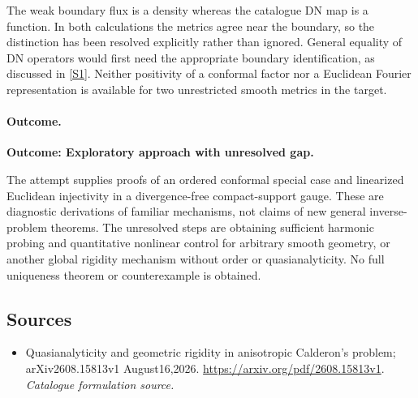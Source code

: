 \documentclass[11pt,a4paper]{article}
\newcommand{\sref}[2]{\hyperlink{source:#1:#2}{[S#2]}}
\numberwithin{equation}{section}
\begin{document}
The weak boundary flux is a density whereas the catalogue DN map is a
function. In both calculations the metrics agree near the boundary, so
the distinction has been resolved explicitly rather than ignored. General
equality of DN operators would first need the appropriate boundary
identification, as discussed in \sref{30006770}{1}. Neither positivity of a
conformal factor nor a Euclidean Fourier representation is available for
two unrestricted smooth metrics in the target.

\paragraph{Outcome.}
\textbf{Outcome: Exploratory approach with unresolved gap.}

The attempt supplies proofs of an ordered conformal special case and
linearized Euclidean injectivity in a divergence-free compact-support
gauge. These are diagnostic derivations of familiar mechanisms, not claims
of new general inverse-problem theorems. The unresolved steps are obtaining
sufficient harmonic probing and quantitative nonlinear control for arbitrary
smooth geometry, or another global rigidity mechanism without order or
quasianalyticity. No full uniqueness theorem or counterexample is obtained.
\subsection{Sources}
\begin{itemize}\raggedright
\item[\textnormal{[S1]}]\hypertarget{source:30006770:1}{} Quasianalyticity and geometric rigidity in anisotropic Calderon's problem; arXiv2608.15813v1 August16,2026.
\url{https://arxiv.org/pdf/2608.15813v1}.
{\small\textit{Catalogue formulation source.}}
\end{itemize}
\end{document}
